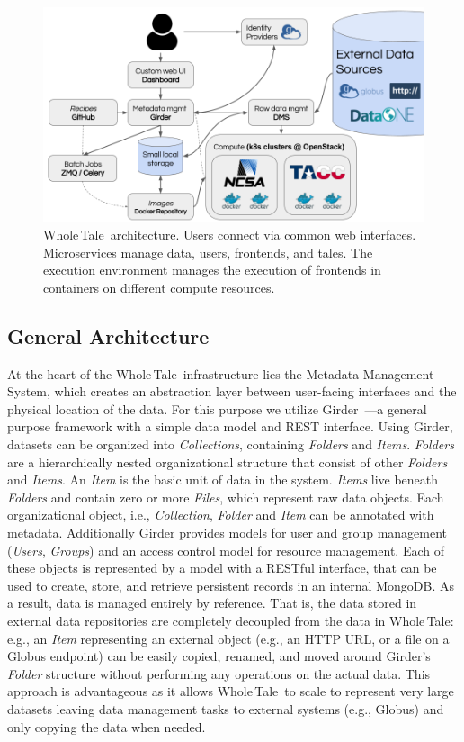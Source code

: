 \documentclass{elsarticle}
\newcommand{\wt}{Whole\,Tale}
\begin{document}
\begin{figure}[ht!]
\centering
  \includegraphics[trim=0in 0in 0in 0in,clip,width=.75\columnwidth]{Arch_WT.png}
\caption{\wt\ architecture. Users connect via common web interfaces. Microservices manage data, users, frontends, and tales. The execution environment manages the execution of frontends in containers on different compute resources. \label{fig:arch}}
 \end{figure}

\subsection{General Architecture}
At the heart of the \wt\ infrastructure lies the Metadata Management System,
which creates an abstraction layer between user-facing interfaces and the physical
location of the data. For this purpose we utilize Girder~\cite{girder}---a general purpose framework with a simple data
model and REST interface. 
Using Girder, datasets can be organized into \emph{Collections}, containing \emph{Folders} and \emph{Items}. \emph{Folders}
are a hierarchically nested organizational structure that consist of other
\emph{Folders} and \emph{Items}. An \emph{Item} is the basic unit of data in the
system. \emph{Items} live beneath \emph{Folders} and contain zero or more
\emph{Files}, which represent raw data objects. Each organizational object, i.e., 
\emph{Collection}, \emph{Folder} and \emph{Item} can be annotated with metadata.
Additionally Girder provides
models for user and group management (\emph{Users}, \emph{Groups}) and an access control model for resource management. 
Each of these objects is represented by a model with a RESTful
interface, that can be used to create, store, and retrieve persistent records
in an internal MongoDB. %
As a result, data is managed entirely by reference. That is, 
the data stored in external data repositories are completely decoupled
from the data in \wt: e.g., an \emph{Item} representing an external object (e.g., an HTTP URL, or a file on a Globus endpoint) can be easily copied, renamed, and moved around
Girder's \emph{Folder} structure without performing any operations on the
actual data. This approach is advantageous as it allows \wt\ to 
scale to represent very large datasets leaving data management tasks to
external systems (e.g., Globus) and only copying the data when needed. 
\end{document}
